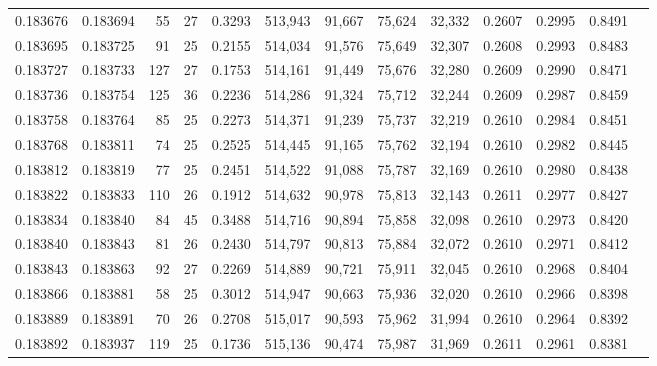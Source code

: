 \begin{tabular}{rrrrrrrrrrrrr}
0.183676 & 0.183694 &    55 &  27 &                                     0.3293 & 513,943 &  91,667 &  75,624 &  32,332 & 0.2607 & 0.2995 & 0.8491 \\
0.183695 & 0.183725 &    91 &  25 &                                     0.2155 & 514,034 &  91,576 &  75,649 &  32,307 & 0.2608 & 0.2993 & 0.8483 \\
0.183727 & 0.183733 &   127 &  27 &                                     0.1753 & 514,161 &  91,449 &  75,676 &  32,280 & 0.2609 & 0.2990 & 0.8471 \\
0.183736 & 0.183754 &   125 &  36 &                                     0.2236 & 514,286 &  91,324 &  75,712 &  32,244 & 0.2609 & 0.2987 & 0.8459 \\
0.183758 & 0.183764 &    85 &  25 &                                     0.2273 & 514,371 &  91,239 &  75,737 &  32,219 & 0.2610 & 0.2984 & 0.8451 \\
0.183768 & 0.183811 &    74 &  25 &                                     0.2525 & 514,445 &  91,165 &  75,762 &  32,194 & 0.2610 & 0.2982 & 0.8445 \\
0.183812 & 0.183819 &    77 &  25 &                                     0.2451 & 514,522 &  91,088 &  75,787 &  32,169 & 0.2610 & 0.2980 & 0.8438 \\
0.183822 & 0.183833 &   110 &  26 &                                     0.1912 & 514,632 &  90,978 &  75,813 &  32,143 & 0.2611 & 0.2977 & 0.8427 \\
0.183834 & 0.183840 &    84 &  45 &                                     0.3488 & 514,716 &  90,894 &  75,858 &  32,098 & 0.2610 & 0.2973 & 0.8420 \\
0.183840 & 0.183843 &    81 &  26 &                                     0.2430 & 514,797 &  90,813 &  75,884 &  32,072 & 0.2610 & 0.2971 & 0.8412 \\
0.183843 & 0.183863 &    92 &  27 &                                     0.2269 & 514,889 &  90,721 &  75,911 &  32,045 & 0.2610 & 0.2968 & 0.8404 \\
0.183866 & 0.183881 &    58 &  25 &                                     0.3012 & 514,947 &  90,663 &  75,936 &  32,020 & 0.2610 & 0.2966 & 0.8398 \\
0.183889 & 0.183891 &    70 &  26 &                                     0.2708 & 515,017 &  90,593 &  75,962 &  31,994 & 0.2610 & 0.2964 & 0.8392 \\
0.183892 & 0.183937 &   119 &  25 &                                     0.1736 & 515,136 &  90,474 &  75,987 &  31,969 & 0.2611 & 0.2961 & 0.8381 \\

\end{tabular}

